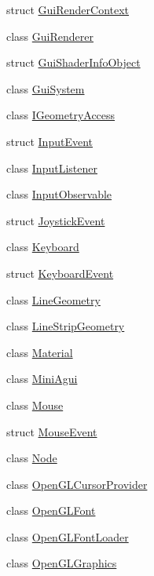 \begin{DoxyCompactItemize}
\item 
struct \mbox{\hyperlink{structec_1_1_gui_render_context}{Gui\+Render\+Context}}
\item 
class \mbox{\hyperlink{classec_1_1_gui_renderer}{Gui\+Renderer}}
\item 
struct \mbox{\hyperlink{structec_1_1_gui_shader_info_object}{Gui\+Shader\+Info\+Object}}
\item 
class \mbox{\hyperlink{classec_1_1_gui_system}{Gui\+System}}
\item 
class \mbox{\hyperlink{classec_1_1_i_geometry_access}{I\+Geometry\+Access}}
\item 
struct \mbox{\hyperlink{structec_1_1_input_event}{Input\+Event}}
\item 
class \mbox{\hyperlink{classec_1_1_input_listener}{Input\+Listener}}
\item 
class \mbox{\hyperlink{classec_1_1_input_observable}{Input\+Observable}}
\item 
struct \mbox{\hyperlink{structec_1_1_joystick_event}{Joystick\+Event}}
\item 
class \mbox{\hyperlink{classec_1_1_keyboard}{Keyboard}}
\item 
struct \mbox{\hyperlink{structec_1_1_keyboard_event}{Keyboard\+Event}}
\item 
class \mbox{\hyperlink{classec_1_1_line_geometry}{Line\+Geometry}}
\item 
class \mbox{\hyperlink{classec_1_1_line_strip_geometry}{Line\+Strip\+Geometry}}
\item 
class \mbox{\hyperlink{classec_1_1_material}{Material}}
\item 
class \mbox{\hyperlink{classec_1_1_mini_agui}{Mini\+Agui}}
\item 
class \mbox{\hyperlink{classec_1_1_mouse}{Mouse}}
\item 
struct \mbox{\hyperlink{structec_1_1_mouse_event}{Mouse\+Event}}
\item 
class \mbox{\hyperlink{classec_1_1_node}{Node}}
\item 
class \mbox{\hyperlink{classec_1_1_open_g_l_cursor_provider}{Open\+G\+L\+Cursor\+Provider}}
\item 
class \mbox{\hyperlink{classec_1_1_open_g_l_font}{Open\+G\+L\+Font}}
\item 
class \mbox{\hyperlink{classec_1_1_open_g_l_font_loader}{Open\+G\+L\+Font\+Loader}}
\item 
class \mbox{\hyperlink{classec_1_1_open_g_l_graphics}{Open\+G\+L\+Graphics}}
\item 

\end{DoxyCompactItemize}
